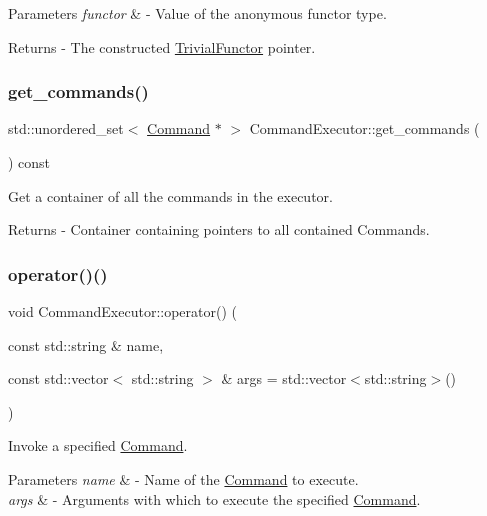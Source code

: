 \begin{DoxyParams}{Parameters}
{\em functor} & -\/ Value of the anonymous functor type. \\
\hline
\end{DoxyParams}
\begin{DoxyReturn}{Returns}
-\/ The constructed \mbox{\hyperlink{class_trivial_functor}{Trivial\+Functor}} pointer. 
\end{DoxyReturn}
\mbox{\label{class_command_executor_a60a3ab2b3f7fde5c64bd213461061126}} 
\subsubsection{\texorpdfstring{get\+\_\+commands()}{get\_commands()}}
{\footnotesize\ttfamily std\+::unordered\+\_\+set$<$ \mbox{\hyperlink{class_command}{Command}} $\ast$ $>$ Command\+Executor\+::get\+\_\+commands (\begin{DoxyParamCaption}{ }\end{DoxyParamCaption}) const}

Get a container of all the commands in the executor. \begin{DoxyReturn}{Returns}
-\/ Container containing pointers to all contained Commands. 
\end{DoxyReturn}
\mbox{\label{class_command_executor_a1076730c7e82e790ed11566677883b5e}} 
\subsubsection{\texorpdfstring{operator()()}{operator()()}}
{\footnotesize\ttfamily void Command\+Executor\+::operator() (\begin{DoxyParamCaption}\item[{const std\+::string \&}]{name,  }\item[{const std\+::vector$<$ std\+::string $>$ \&}]{args = {\ttfamily std\+:\+:vector$<$std\+:\+:string$>$()} }\end{DoxyParamCaption})}

Invoke a specified \mbox{\hyperlink{class_command}{Command}}. 
\begin{DoxyParams}{Parameters}
{\em name} & -\/ Name of the \mbox{\hyperlink{class_command}{Command}} to execute. \\
\hline
{\em args} & -\/ Arguments with which to execute the specified \mbox{\hyperlink{class_command}{Command}}. \\
\hline
\end{DoxyParams}
\mbox{\label{class_command_executor_a37052aaf61623b511be1f75cbecab8b7}} 
